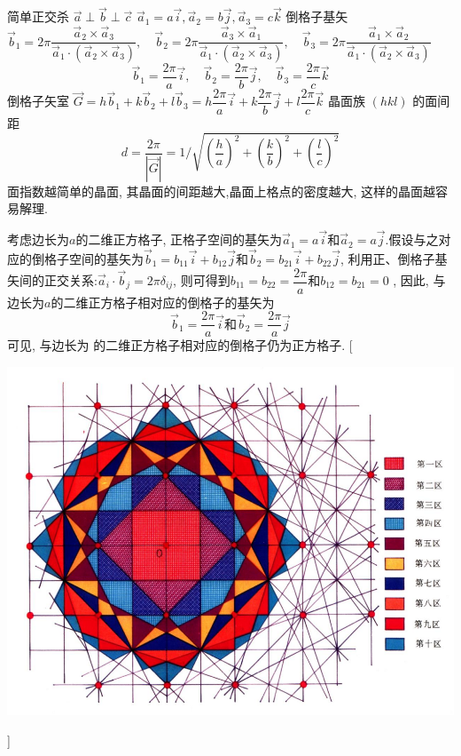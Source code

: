 \documentclass[UTF8,10pt, a4paper, oneside]{ctexart}
\begin{document}
        {简单正交杀 $\vec{a} \perp \vec{b} \perp \vec{c}$ $ \vec{a}_{1}=a\vec{i}, \vec{a}_{2}=b \vec{j}, \vec{a}_3=c\vec{k}$
        倒格子基矢 $\vec{b}_{1}=2 \pi \dfrac{\vec{a}_{2} \times \vec{a}_{3}}{\vec{a}_{1} \cdot (\vec{a}_{2} \times \vec{a}_{3})}, \quad \vec{b}_{2}=2 \pi \dfrac{\vec{a}_{3} \times \vec{a}_{1}}{\vec{a}_{1} \cdot(\vec{a}_{2} \times \vec{a}_{3})}, \quad \vec{b}_{3}=2 \pi \dfrac{\vec{a}_{1} \times \vec{a}_{2}}{\vec{a}_{1} \cdot (\vec{a}_{2} \times \vec{a}_{3})}$
        $$
        \vec{b}_{1}=\dfrac{2 \pi}{a} \vec{i}, \quad \vec{b}_{2}=\dfrac{2 \pi}{b} \vec{j}, \quad \vec{b}_{3}=\dfrac{2 \pi}{c} \vec{k}
        $$
        倒格子矢室 $\vec{G}=h \vec{b}_{1}+k \vec{b}_{2}+l \vec{b}_{3}=h \dfrac{2 \pi}{a} \vec{i}+k \dfrac{2 \pi}{b} \vec{j}+l \dfrac{2 \pi}{c} \vec{k}$ 晶面族  $(hkl)$ 的面间距
        $$
        d=\dfrac{2 \pi}{|\vec{G}|}=1 / \sqrt{(\dfrac{h}{a})^{2}+(\dfrac{k}{b})^{2}+(\dfrac{l}{c})^{2}}
        $$ 面指数越简单的晶面, 其晶面的间距越大,晶面上格点的密度越大, 这样的晶面越容易解理.}

    {考虑边长为$a$的二维正方格子, 正格子空间的基矢为$\vec{a}_1=a\vec{i}$和$\vec{a}_2=a\vec{j}$.假设与之对应的倒格子空间的基矢为$\vec{b}_1=b_{11}\vec{i}+b_{12}\vec{j}$和$\vec{b}_2=b_{21}\vec{i}+b_{22}\vec{j}$, 利用正、倒格子基矢间的正交关系:$\vec{a}_i \cdot \vec{b}_j =2 \pi \delta_{ij}$, 则可得到$b_{11}=b_{22}=\dfrac{2 \pi}{a}$和$b_{12}=b_{21}=0$ , 因此, 与边长为$a$的二维正方格子相对应的倒格子的基矢为\[\vec{b}_1=\dfrac{2 \pi}{a}\vec{i} \text{和} \vec{b}_2=\dfrac{2 \pi}{a}\vec{j}\]
     可见, 与边长为  的二维正方格子相对应的倒格子仍为正方格子.}
     [\begin{center}
        \includegraphics{picture/3-10 .png}
    \end{center}]
\end{document}
